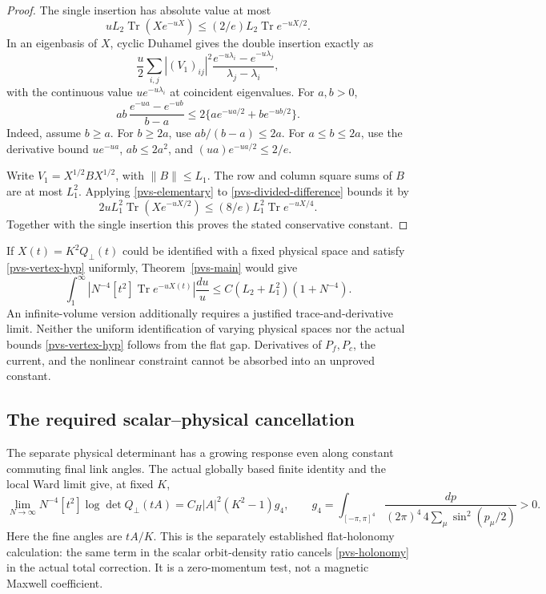 \documentclass[11pt]{article}
\theoremstyle{remark}
\begin{document}
\begin{proof}
The single insertion has absolute value at most
\[
 uL_2\operatorname{Tr}(Xe^{-uX})
 \le(2/e)L_2\operatorname{Tr}e^{-uX/2}.
\]
In an eigenbasis of \(X\), cyclic Duhamel gives the double
insertion exactly as
\begin{equation}
 \frac u2\sum_{i,j}|(V_1)_{ij}|^2
       \frac{e^{-u\lambda_i}-e^{-u\lambda_j}}
                         {\lambda_j-\lambda_i},
 \label{pvs-divided-difference}
\end{equation}
with the continuous value \(ue^{-u\lambda_i}\) at coincident
eigenvalues.
For \(a,b>0\),
\begin{equation}
 ab\,\frac{e^{-ua}-e^{-ub}}{b-a}
 \le2\{ae^{-ua/2}+be^{-ub/2}\}.
 \label{pvs-elementary}
\end{equation}
Indeed, assume \(b\ge a\).
For \(b\ge2a\), use \(ab/(b-a)\le2a\).
For \(a\le b\le2a\), use the derivative bound
\(ue^{-ua}\), \(ab\le2a^2\), and
\((ua)e^{-ua/2}\le2/e\).

Write \(V_1=X^{1/2}BX^{1/2}\), with \(\|B\|\le L_1\).
The row and column square sums of \(B\) are at most \(L_1^2\).
Applying \eqref{pvs-elementary} to
\eqref{pvs-divided-difference} bounds it by
\[
 2uL_1^2\operatorname{Tr}(Xe^{-uX/2})
 \le(8/e)L_1^2\operatorname{Tr}e^{-uX/4}.
\]
Together with the single insertion this proves the stated
conservative constant.
\end{proof}

If \(X(t)=K^2Q_\perp(t)\) could be identified with a fixed
physical space and satisfy \eqref{pvs-vertex-hyp} uniformly,
Theorem~\ref{pvs-main} would give
\begin{equation}
 \int_1^\infty
 \left|N^{-4}[t^2]\operatorname{Tr}e^{-uX(t)}\right|
 \frac{du}{u}
 \le C(L_2+L_1^2)(1+N^{-4}).
 \label{pvs-conditional-tail}
\end{equation}
An infinite-volume version additionally requires a justified
trace-and-derivative limit.
Neither the uniform identification of varying physical spaces
nor the actual bounds \eqref{pvs-vertex-hyp} follows from the
flat gap.
Derivatives of \(P_f,P_c\), the current, and the nonlinear
constraint cannot be absorbed into an unproved constant.

\subsection{The required scalar--physical cancellation}
\label{pvs-scope-section}

The separate physical determinant has a growing response even
along constant commuting final link angles.
The actual globally based finite identity and the local Ward
limit give, at fixed \(K\),
\begin{equation}
 \lim_{N\to\infty}N^{-4}[t^2]\log\det Q_\perp(tA)
   =C_H|A|^2(K^2-1)g_4,\qquad
 g_4=\int_{[-\pi,\pi]^4}
       \frac{dp}{(2\pi)^4\,4\sum_\mu\sin^2(p_\mu/2)}>0 .
 \label{pvs-holonomy}
\end{equation}
Here the fine angles are \(tA/K\).
This is the separately established flat-holonomy calculation:
the same term in the scalar orbit-density ratio cancels
\eqref{pvs-holonomy} in the actual total correction.
It is a zero-momentum test, not a magnetic Maxwell coefficient.
\end{document}
